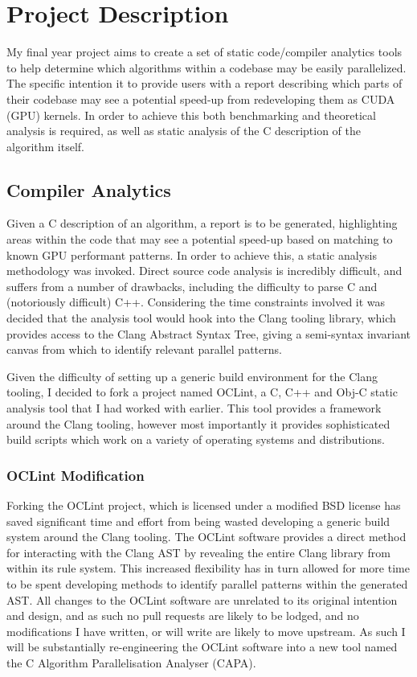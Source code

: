 
\section{Project Description}
My final year project aims to create a set of static code/compiler analytics tools to help determine which algorithms within a codebase may be easily parallelized. The specific intention it to provide users with a report describing which parts of their codebase may see a potential speed-up from redeveloping them as CUDA (GPU) kernels. In order to achieve this both benchmarking and theoretical analysis is required, as well as static analysis of the C description of the algorithm itself.

\subsection{Compiler Analytics}
Given a C description of an algorithm, a report is to be generated, highlighting areas within the code that may see a potential speed-up based on matching to known GPU performant patterns. In order to achieve this, a static analysis methodology was invoked. Direct source code analysis is incredibly difficult, and suffers from a number of drawbacks, including the difficulty to parse C and (notoriously difficult) C++. Considering the time constraints involved it was decided that the analysis tool would hook into the Clang tooling library, which provides access to the Clang Abstract Syntax Tree, giving a semi-syntax invariant canvas from which to identify relevant parallel patterns.

Given the difficulty of setting up a generic build environment for the Clang tooling, I decided to fork a project named OCLint, a C, C++ and Obj-C static analysis tool that I had worked with earlier. This tool provides a framework around the Clang tooling, however most importantly it provides sophisticated build scripts which work on a variety of operating systems and distributions.

\subsubsection{OCLint Modification}
Forking the OCLint project, which is licensed under a modified BSD license has saved significant time and effort from being wasted developing a generic build system around the Clang tooling. The OCLint software provides a direct method for interacting with the Clang AST by revealing the entire Clang library from within its rule system. This increased flexibility has in turn allowed for more time to be spent developing methods to identify parallel patterns within the generated AST. All changes to the OCLint software are unrelated to its original intention and design, and as such no pull requests are likely to be lodged, and no modifications I have written, or will write are likely to move upstream. As such I will be substantially re-engineering the OCLint software into a new tool named the C Algorithm Parallelisation Analyser (CAPA).

